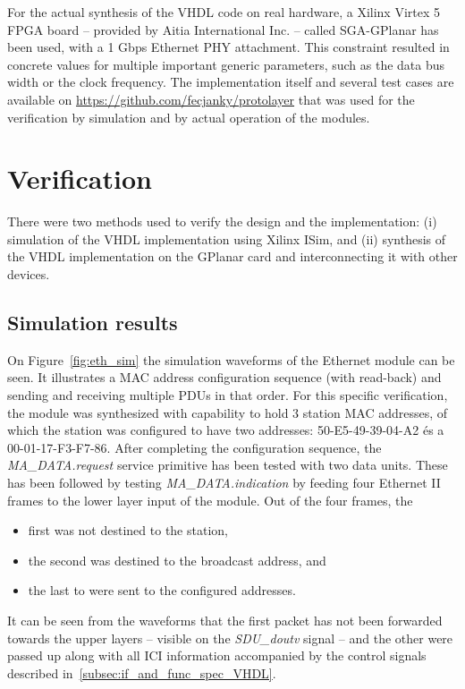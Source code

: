 \documentclass[conference]{IEEEtran}
\begin{document}
For the actual synthesis of the VHDL code on real hardware, a Xilinx Virtex 5 FPGA board -- provided by Aitia International Inc. -- called SGA-GPlanar \cite{GPlanar} has been used, with a 1 Gbps Ethernet PHY attachment. This constraint resulted in concrete values for multiple important generic parameters, such as the data bus width or the clock frequency.
The implementation itself and several test cases are available on \cite{GIT_protolayer} \url{https://github.com/fecjanky/protolayer} that was used for the verification by simulation and by actual operation of the modules.

\section{Verification}\label{sec:Verification}

There were two methods used to verify the design and the implementation: (i) simulation of the VHDL implementation using Xilinx ISim, and (ii) synthesis of the VHDL implementation on the GPlanar card and interconnecting it with other devices.

\subsection{Simulation results}

On Figure~\ref{fig:eth_sim} the simulation waveforms of the Ethernet module can be seen. It illustrates a MAC address configuration sequence (with read-back) and sending and receiving multiple PDUs in that order. For this specific verification, the module was synthesized with capability to hold 3 station MAC addresses, of which the station was configured to have two addresses: 50-E5-49-39-04-A2 és a 00-01-17-F3-F7-86. After completing the configuration sequence, the \emph{MA\_DATA.request} service primitive has been tested with two data units. These has been followed by testing \emph{MA\_DATA.indication} by feeding four Ethernet II frames to the lower layer input of the module. Out of the four frames, the 
\begin{itemize}
\renewcommand \labelitemi{--}
\item first was not destined to the station,
\item the second was destined to the broadcast address, and
\item the last to were sent to the configured addresses.
\end{itemize}
It can be seen from the waveforms that the first packet has not been forwarded towards the upper layers -- visible on the \emph{SDU\_doutv} signal -- and the other were passed up along with all ICI information accompanied by the control signals described in~\ref{subsec:if_and_func_spec_VHDL}.
\end{document}
